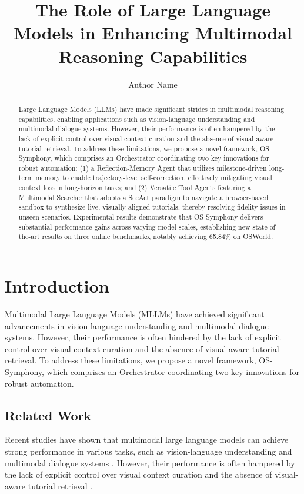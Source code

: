 \documentclass{article}
\begin{document}
\title{The Role of Large Language Models in Enhancing Multimodal Reasoning Capabilities}

\author{Author Name}

\maketitle

\begin{abstract}
Large Language Models (LLMs) have made significant strides in multimodal reasoning capabilities, enabling applications such as vision-language understanding and multimodal dialogue systems. However, their performance is often hampered by the lack of explicit control over visual context curation and the absence of visual-aware tutorial retrieval. To address these limitations, we propose a novel framework, OS-Symphony, which comprises an Orchestrator coordinating two key innovations for robust automation: (1) a Reflection-Memory Agent that utilizes milestone-driven long-term memory to enable trajectory-level self-correction, effectively mitigating visual context loss in long-horizon tasks; and (2) Versatile Tool Agents featuring a Multimodal Searcher that adopts a SeeAct paradigm to navigate a browser-based sandbox to synthesize live, visually aligned tutorials, thereby resolving fidelity issues in unseen scenarios. Experimental results demonstrate that OS-Symphony delivers substantial performance gains across varying model scales, establishing new state-of-the-art results on three online benchmarks, notably achieving 65.84\% on OSWorld.

\end{abstract}

\section{Introduction}
Multimodal Large Language Models (MLLMs) have achieved significant advancements in vision-language understanding and multimodal dialogue systems. However, their performance is often hindered by the lack of explicit control over visual context curation and the absence of visual-aware tutorial retrieval. To address these limitations, we propose a novel framework, OS-Symphony, which comprises an Orchestrator coordinating two key innovations for robust automation.

\subsection{Related Work}
Recent studies have shown that multimodal large language models can achieve strong performance in various tasks, such as vision-language understanding and multimodal dialogue systems \cite{mishra2026scalingvisionlanguagemodels}. However, their performance is often hampered by the lack of explicit control over visual context curation and the absence of visual-aware tutorial retrieval \cite{yang2026ossymphonyholisticframeworkrobust}.
\end{document}
